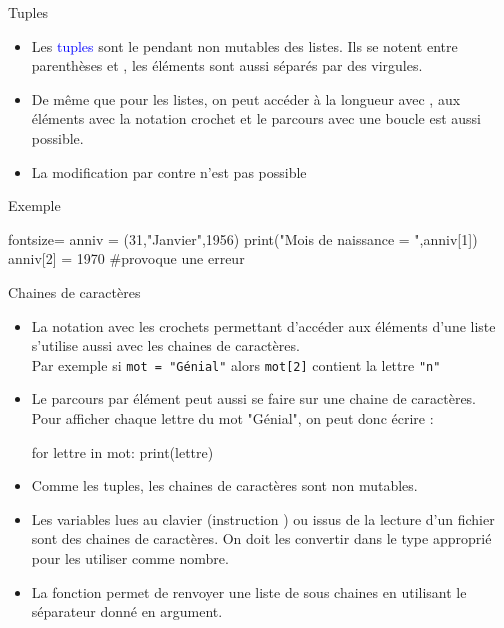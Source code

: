 \documentclass[10pt]{beamer}
\begin{document}
\begin{frame}[fragile]{\Ctitle}{\stitle}
	\begin{alertblock}{Tuples}
		\begin{itemize}
			\item<1-> Les \textcolor{blue}{tuples} sont le pendant non mutables des listes. Ils se notent entre parenthèses \kw{(} et \kw{)}, les éléments sont aussi séparés par des virgules.
			\item<2-> De même que pour les listes, on peut accéder à la longueur avec , aux éléments avec la notation crochet et le parcours avec une boucle  est aussi possible.
			\item<3-> La modification par contre n'est pas possible
		\end{itemize}
	\end{alertblock}
	\begin{exampleblock}{Exemple}
		\begin{codepython*}{fontsize=\small}
			anniv = (31,"Janvier",1956)
			print("Mois de naissance = ",anniv[1])
			anniv[2] = 1970 #provoque une erreur
		\end{codepython*}
	\end{exampleblock}
\end{frame}

\begin{frame}[fragile]{\Ctitle}{\stitle}
	\begin{alertblock}{Chaines de caractères}
		\begin{itemize}
			\item<1-> La notation avec les crochets permettant d'accéder aux éléments d'une liste s'utilise aussi avec les chaines de caractères. \\
				\onslide<2-> Par exemple si \texttt{mot = "Génial"} alors \texttt{mot[2]} contient la lettre \texttt{"n"}
			\item<3-> Le parcours par élément peut aussi se faire sur une chaine de caractères. \\
				\onslide<4-> Pour afficher chaque lettre du mot "Génial", on peut donc écrire :
				\onslide<5->\begin{codepython}
					for lettre in mot:
					print(lettre)
				\end{codepython}
			\item<6-> Comme les tuples, les chaines de caractères sont non mutables.
			\item<7-> \textcolor{blue}{\small \important} Les variables lues au clavier (instruction ) ou issus de la lecture d'un fichier sont des chaines de caractères. On doit les convertir dans le type approprié pour les utiliser comme nombre.
			\item<8-> La fonction  permet de renvoyer une liste de sous chaines en utilisant le séparateur donné en argument.
		\end{itemize}
	\end{alertblock}
\end{frame}
\end{document}
